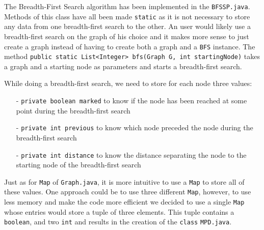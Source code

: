 \documentclass{article}
\begin{document}
The Breadth-First Search algorithm has been implemented in the \texttt{BFSSP.java}. Methods of this class have all been made \texttt{static} as it is not necessary to store any data from one breadth-first search to the other. An user would likely use a breadth-first search on the graph of his choice and it makes more sense to just create a graph instead of having to create both a graph and a \texttt{BFS} instance. The method \texttt{public static List<Integer> bfs(Graph G, int startingNode)} takes a graph and a starting node as parameters and starts a breadth-first search.

While doing a breadth-first search, we need to store for each node three values:
\begin{itemize}
\item[-]\texttt{private boolean marked} to know if the node has been reached at some point during the breadth-first search
\item[-]\texttt{private int previous} to know which node preceded the node during the breadth-first search
\item[-]\texttt{private int distance} to know the distance separating the node to the starting node of the breadth-first search
\end{itemize}

Just as for \texttt{Map} of \texttt{Graph.java}, it is more intuitive to use a \texttt{Map} to store all of these values. One approach could be to use three different \texttt{Map}, however, to use less memory and make the code more efficient we decided to use a single \texttt{Map} whose entries would store a tuple of three elements. This tuple contains a \texttt{boolean}, and two \texttt{int} and results in the creation of the \texttt{class} \texttt{MPD.java}.
\end{document}
